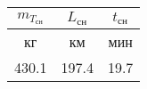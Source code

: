 \begin{tabular}{|c|c|c|}
\hline
$m_{T_{сн}}$ & $L_{сн}$ & $t_{сн}$ \\ 
\hline
кг & км & мин \\ 
\hline
430.1 & 197.4 & 19.7 \\ 
\hline
\end{tabular}